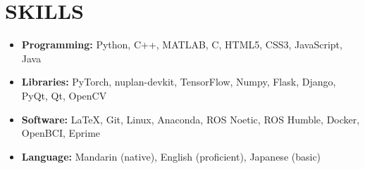 \documentclass[a4paper,9pt]{extarticle}
\begin{document}
\section*{SKILLS}
\begin{itemize}
    \item \textbf{Programming:} Python, C++, MATLAB, C, HTML5, CSS3, JavaScript, Java
    \item \textbf{Libraries:} PyTorch, nuplan-devkit, TensorFlow, Numpy, Flask, Django, PyQt, Qt, OpenCV
    \item \textbf{Software:} \LaTeX, Git, Linux, Anaconda, ROS Noetic, ROS Humble, Docker, OpenBCI, Eprime
    \item \textbf{Language:} Mandarin (native), English (proficient), Japanese (basic)
\end{itemize}
\end{document}
